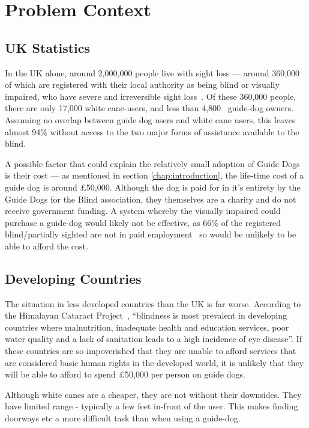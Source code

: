 \section{Problem Context}
\subsection{UK Statistics}
In the UK alone, around 2,000,000 people live with sight loss --- around 360,000 of which are registered with their local authority as being blind or visually impaired, who have severe and irreversible sight loss~\cite{uk-blind}.  Of these 360,000 people, there are only 17,000 white cane-users, and less than 4,800~\cite{guidedog-count} guide-dog owners. Assuming no overlap between guide dog users and white cane users, this leaves almost 94\% without access to the two major forms of assistance available to the blind.

A possible factor that could explain the relatively small adoption of Guide Dogs is their cost --- as mentioned in section \ref{chap:introduction}, the life-time cost of a guide dog is around \pounds50,000. Although the dog is paid for in it's entirety by the Guide Dogs for the Blind association, they themselves are a charity and do not receive government funding. A system whereby the visually impaired could purchase a guide-dog would likely not be effective, as 66\% of the registered blind/partially sighted are not in paid employment~\cite{afbff} so would be unlikely to be able to afford the cost.

\subsection{Developing Countries}
The situation in less developed countries than the UK is far worse. According to the Himalayan Cataract Project~\cite{worldblindness}, ``blindness is most prevalent in developing countries where malnutrition, inadequate health and education services, poor water quality and a lack of sanitation leads to a high incidence of eye disease''. If these countries are so impoverished that they are unable to afford services that are considered basic human rights in the developed world, it is unlikely that they will be able to afford to spend \pounds50,000 per person on guide dogs. 

Although white canes are a cheaper, they are not without their downsides. They have limited range - typically a few feet in-front of the user. This makes finding doorways etc a more difficult task than when using a guide-dog.

